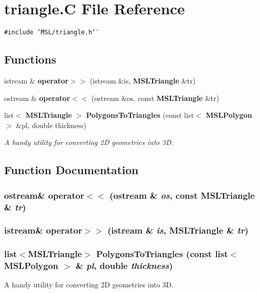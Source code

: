 \section{triangle.C File Reference}
\label{triangle_8C}
{\tt \#include \char`\"{}MSL/triangle.h\char`\"{}}\par
\subsection*{Functions}
\begin{CompactItemize}
\item 
istream \& {\bf operator$>$$>$} (istream \&is, {\bf MSLTriangle} \&tr)
\item 
ostream \& {\bf operator$<$$<$} (ostream \&os, const {\bf MSLTriangle} \&tr)
\item 
list$<$ {\bf MSLTriangle} $>$ {\bf Polygons\-To\-Triangles} (const list$<$ {\bf MSLPolygon} $>$ \&pl, double thickness)
\begin{CompactList}\small\item\em A handy utility for converting 2D geometries into 3D.\item\end{CompactList}\end{CompactItemize}


\subsection{Function Documentation}
\subsubsection{\setlength{\rightskip}{0pt plus 5cm}ostream\& operator$<$$<$ (ostream \& {\em os}, const {\bf MSLTriangle} \& {\em tr})}\label{triangle_8C_a1}


\subsubsection{\setlength{\rightskip}{0pt plus 5cm}istream\& operator$>$$>$ (istream \& {\em is}, {\bf MSLTriangle} \& {\em tr})}\label{triangle_8C_a0}


\subsubsection{\setlength{\rightskip}{0pt plus 5cm}list$<${\bf MSLTriangle}$>$ Polygons\-To\-Triangles (const list$<$ {\bf MSLPolygon} $>$ \& {\em pl}, double {\em thickness})}\label{triangle_8C_a2}


A handy utility for converting 2D geometries into 3D.

